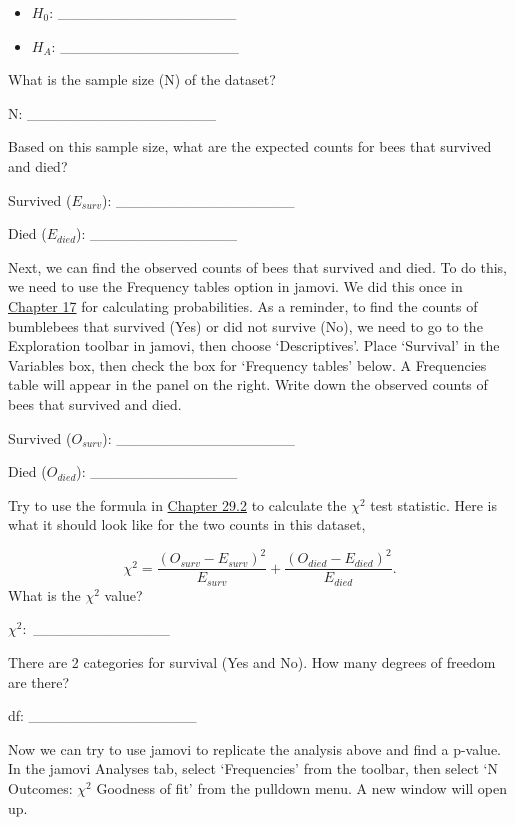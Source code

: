 \documentclass[
  openany]{krantz}
\begin{document}
\begin{itemize}
\item
  \(H_{0}\): \_\_\_\_\_\_\_\_\_\_\_\_\_\_\_\_\_
\item
  \(H_{A}\): \_\_\_\_\_\_\_\_\_\_\_\_\_\_\_\_\_
\end{itemize}

What is the sample size (N) of the dataset?

N: \_\_\_\_\_\_\_\_\_\_\_\_\_\_\_\_\_\_

Based on this sample size, what are the expected counts for bees that survived and died?

Survived (\(E_{surv}\)): \_\_\_\_\_\_\_\_\_\_\_\_\_\_\_\_\_

Died (\(E_{died}\)): \_\_\_\_\_\_\_\_\_\_\_\_\_\_

Next, we can find the observed counts of bees that survived and died.
To do this, we need to use the Frequency tables option in jamovi.
We did this once in \protect\hyperlink{Chapter_17}{Chapter 17} for calculating probabilities.
As a reminder, to find the counts of bumblebees that survived (Yes) or did not survive (No), we need to go to the Exploration toolbar in jamovi, then choose `Descriptives'.
Place `Survival' in the Variables box, then check the box for `Frequency tables' below.
A Frequencies table will appear in the panel on the right.
Write down the observed counts of bees that survived and died.

Survived (\(O_{surv}\)): \_\_\_\_\_\_\_\_\_\_\_\_\_\_\_\_\_

Died (\(O_{died}\)): \_\_\_\_\_\_\_\_\_\_\_\_\_\_

Try to use the formula in \protect\hyperlink{chi-squared-goodness-of-fit}{Chapter 29.2} to calculate the \(\chi^{2}\) test statistic.
Here is what it should look like for the two counts in this dataset,

\[\chi^{2} = \frac{(O_{surv} - E_{surv})^{2}}{E_{surv}} + \frac{(O_{died} - E_{died})^{2}}{E_{died}}.\]
What is the \(\chi^{2}\) value?

\(\chi^{2}:\) \_\_\_\_\_\_\_\_\_\_\_\_\_

There are 2 categories for survival (Yes and No).
How many degrees of freedom are there?

df: \_\_\_\_\_\_\_\_\_\_\_\_\_\_\_\_

Now we can try to use jamovi to replicate the analysis above and find a p-value.
In the jamovi Analyses tab, select `Frequencies' from the toolbar, then select `N Outcomes: \(\chi^{2}\) Goodness of fit' from the pulldown menu.
A new window will open up.
\end{document}
